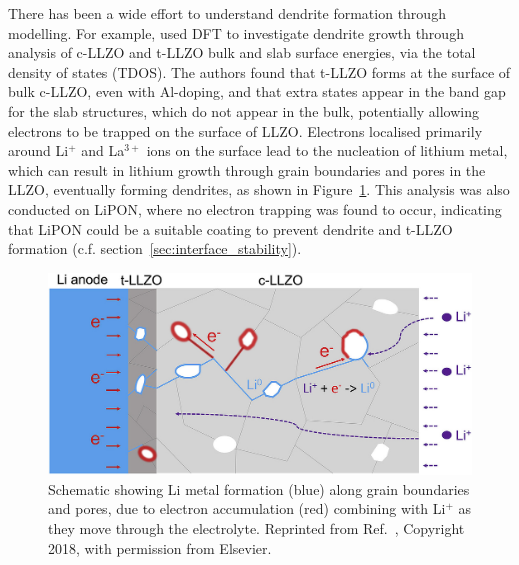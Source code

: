 \documentclass[../main.tex]{subfiles}
\begin{document}
There has been a wide effort to understand dendrite formation through modelling.\cite{Canepa2018, Tian2018, Gao2020} For example, \citeauthor{Tian2018} used DFT to investigate dendrite growth through analysis of c-LLZO and t-LLZO bulk and slab surface energies, via the total density of states (TDOS).\cite{Tian2018} The authors found that t-LLZO forms at the surface of bulk c-LLZO, even with Al-doping,\cite{Ma2016, Rettenwander2018} and that extra states appear in the band gap for the slab structures, which do not appear in the bulk, potentially allowing electrons to be trapped on the surface of LLZO. Electrons localised primarily around Li$^+$ and La$^{3+}$ ions on the surface lead to the nucleation of lithium metal, which can result in lithium growth through grain boundaries and pores in the LLZO, eventually forming dendrites,\cite{Ren2015} as shown in Figure~\ref{fig:tian2020}. This analysis was also conducted on LiPON, where no electron trapping was found to occur, indicating that LiPON could be a suitable coating to prevent dendrite and t-LLZO formation (c.f. section~\ref{sec:interface_stability}).

\begin{figure}[H]
    \centering
    \includegraphics[scale=0.3]{figures/tian_grain_growth.png}
    \caption{Schematic showing Li metal formation (blue) along grain boundaries and pores, due to electron accumulation (red) combining with Li$^+$ as they move through the electrolyte. Reprinted from Ref.~, Copyright 2018, with permission from Elsevier.}
    \label{fig:tian2020}
\end{figure}
\end{document}
